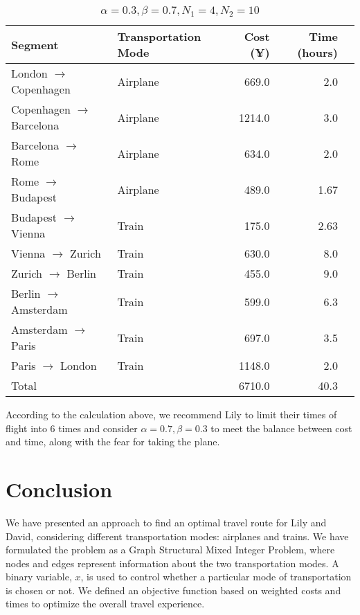 \documentclass{article} %
\begin{document}
\begin{table}[!ht]
  \centering
  \begin{tabular}{llrrr}
    \toprule
    Segment                          & Transportation Mode & Cost (¥) & Time (hours) \\
    \midrule
    London $\rightarrow$  Copenhagen & Airplane            & 669.0    & 2.0          \\
    Copenhagen $\rightarrow$  Barcelona & Airplane          & 1214.0   & 3.0          \\
    Barcelona $\rightarrow$  Rome     & Airplane            & 634.0    & 2.0          \\
    Rome $\rightarrow$  Budapest     & Airplane            & 489.0    & 1.67         \\
    Budapest $\rightarrow$  Vienna    & Train               & 175.0    & 2.63         \\
    Vienna $\rightarrow$  Zurich      & Train               & 630.0    & 8.0          \\
    Zurich $\rightarrow$  Berlin      & Train               & 455.0    & 9.0          \\
    Berlin $\rightarrow$  Amsterdam   & Train               & 599.0    & 6.3          \\
    Amsterdam $\rightarrow$  Paris    & Train               & 697.0    & 3.5          \\
    Paris $\rightarrow$  London       & Train               & 1148.0   & 2.0          \\
    \midrule
    Total                            &                     & 6710.0   & 40.3         \\
    \bottomrule
  \end{tabular}
  \caption{$\alpha=0.3, \beta=0.7, N_1=4, N_2=10$}%
  \label{tab:alpha0.3beta0.7N14}
\end{table}


According to the calculation above, we recommend Lily to limit their times of flight into 6 times and consider $\alpha = 0.7, \beta = 0.3$ to meet the balance between cost and time, along with the fear for taking the plane.

\section{Conclusion}
We have presented an approach to find an optimal travel route for Lily and David, considering different transportation modes: airplanes and trains. We have formulated the problem as a Graph Structural Mixed Integer Problem, where nodes and edges represent information about the two transportation modes. A binary variable, $x$, is used to control whether a particular mode of transportation is chosen or not. We defined an objective function based on weighted costs and times to optimize the overall travel experience.
\end{document}
